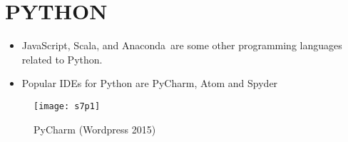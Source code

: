 \documentclass{article}
\begin{document}
	\section{PYTHON}
	\begin{itemize}
		\item JavaScript, Scala, and Anaconda are some other programming languages related  to Python.
		\item Popular IDEs for Python are PyCharm, Atom  and Spyder
	\end{itemize}
\begin{figure}
	\texttt{[image: s7p1]}
	\caption{PyCharm (Wordpress 2015)}
	\label{fig:s7p1}
\end{figure}
\end{document}
